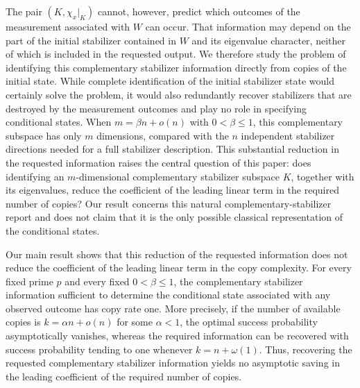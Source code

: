 \documentclass[11pt]{article}
\newcommand{\1}{\mathbf 1}
\theoremstyle{plain}
\theoremstyle{definition}
\theoremstyle{remark}
\begin{document}
The pair $(K,\chi_x|_K)$ cannot, however, predict which outcomes of the measurement associated with $W$ can occur.
That information may depend on the part of the initial stabilizer contained in $W$ and its eigenvalue character, neither of which is included in the requested output.
We therefore study the problem of identifying this complementary stabilizer information directly from copies of the initial state. While complete identification of the initial stabilizer state would certainly solve the problem, it would also redundantly recover stabilizers that are destroyed by the measurement outcomes and play no role in specifying conditional states. 
When \(m=\beta n+o(n)\) with \(0<\beta\leq1\), this complementary subspace has only \(m\) dimensions, 
compared with the \(n\) independent stabilizer directions needed for a full stabilizer description.
This substantial reduction in the requested information raises the central question of this paper: 
does identifying an $m$-dimensional complementary stabilizer subspace $K$, together with its eigenvalues, reduce the coefficient of the leading linear term in the required number of copies? Our result concerns this natural complementary-stabilizer report and does not claim that it is the only possible classical representation of the conditional states.

Our main result shows that this reduction of the requested information does not reduce the coefficient of the leading linear term in the copy complexity. 
For every fixed prime \(p\) and every fixed \(0<\beta\leq1\), the complementary stabilizer information sufficient to determine the conditional state associated with any observed outcome has copy rate one. More precisely, 
if the number of available copies is \(k=\alpha n+o(n)\) for some \(\alpha<1\), 
the optimal success probability asymptotically vanishes, whereas the required information can be recovered with success probability tending to one whenever \(k=n+\omega(1)\). 
Thus, recovering the requested complementary stabilizer information yields no asymptotic saving in the leading coefficient of the required number of copies.
\end{document}
